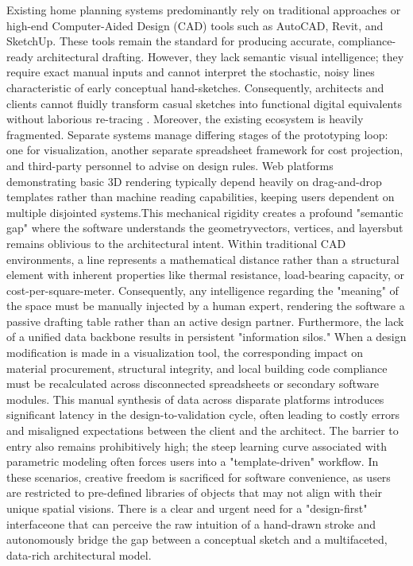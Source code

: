 \documentclass[12pt]{report}
\begin{document}
Existing home planning systems predominantly rely on traditional approaches or high-end Computer-Aided Design (CAD) tools such as AutoCAD, Revit, and SketchUp. These tools remain the standard for producing accurate, compliance-ready architectural drafting. However, they lack semantic visual intelligence; they require exact manual inputs and cannot interpret the stochastic, noisy lines characteristic of early conceptual hand-sketches. Consequently, architects and clients cannot fluidly transform casual sketches into functional digital equivalents without laborious re-tracing\cite{wang2020} .
Moreover, the existing ecosystem is heavily fragmented. Separate systems manage differing stages of the prototyping loop: one for visualization, another separate spreadsheet framework for cost projection, and third-party personnel to advise on design rules. Web platforms demonstrating basic 3D rendering typically depend heavily on drag-and-drop templates rather than machine reading capabilities, keeping users dependent on multiple disjointed systems.This mechanical rigidity creates a profound "semantic gap" where the software understands the geometry\—vectors, vertices, and layers\—but remains oblivious to the architectural intent. Within traditional CAD environments, a line represents a mathematical distance rather than a structural element with inherent properties like thermal resistance, load-bearing capacity, or cost-per-square-meter. Consequently, any intelligence regarding the "meaning" of the space must be manually injected by a human expert, rendering the software a passive drafting table rather than an active design partner.
Furthermore, the lack of a unified data backbone results in persistent "information silos." When a design modification is made in a visualization tool, the corresponding impact on material procurement, structural integrity, and local building code compliance must be recalculated across disconnected spreadsheets or secondary software modules. This manual synthesis of data across disparate platforms introduces significant latency in the design-to-validation cycle, often leading to costly errors and misaligned expectations between the client and the architect.
The barrier to entry also remains prohibitively high; the steep learning curve associated with parametric modeling often forces users into a "template-driven" workflow. In these scenarios, creative freedom is sacrificed for software convenience, as users are restricted to pre-defined libraries of objects that may not align with their unique spatial visions. There is a clear and urgent need for a "design-first" interface\—one that can perceive the raw intuition of a hand-drawn stroke and autonomously bridge the gap between a conceptual sketch and a multifaceted, data-rich architectural model.
\end{document}
